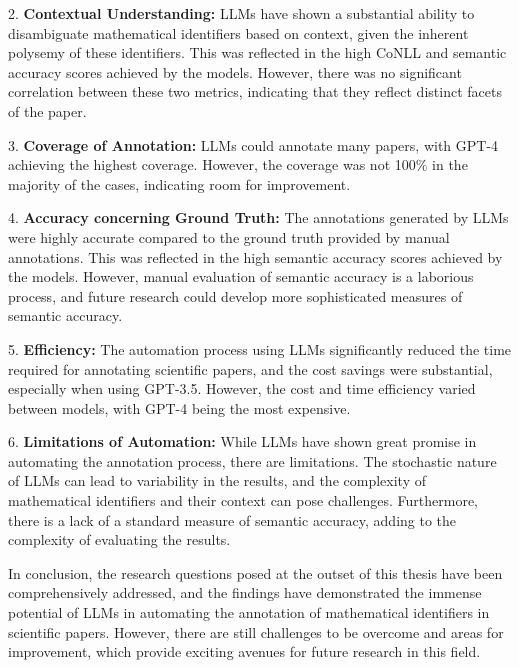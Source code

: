 2. \textbf{Contextual Understanding:} LLMs have shown a substantial ability to disambiguate mathematical identifiers based on context, given the inherent polysemy of these identifiers. This was reflected in the high CoNLL and semantic accuracy scores achieved by the models. However, there was no significant correlation between these two metrics, indicating that they reflect distinct facets of the paper.

3. \textbf{Coverage of Annotation:} LLMs could annotate many papers, with GPT-4 achieving the highest coverage. However, the coverage was not 100\% in the majority of the cases, indicating room for improvement.

4. \textbf{Accuracy concerning Ground Truth:} The annotations generated by LLMs were highly accurate compared to the ground truth provided by manual annotations. This was reflected in the high semantic accuracy scores achieved by the models. However, manual evaluation of semantic accuracy is a laborious process, and future research could develop more sophisticated measures of semantic accuracy.

5. \textbf{Efficiency:} The automation process using LLMs significantly reduced the time required for annotating scientific papers, and the cost savings were substantial, especially when using GPT-3.5. However, the cost and time efficiency varied between models, with GPT-4 being the most expensive.

6. \textbf{Limitations of Automation:} While LLMs have shown great promise in automating the annotation process, there are limitations. The stochastic nature of LLMs can lead to variability in the results, and the complexity of mathematical identifiers and their context can pose challenges. Furthermore, there is a lack of a standard measure of semantic accuracy, adding to the complexity of evaluating the results.

In conclusion, the research questions posed at the outset of this thesis have been comprehensively addressed, and the findings have demonstrated the immense potential of LLMs in automating the annotation of mathematical identifiers in scientific papers. However, there are still challenges to be overcome and areas for improvement, which provide exciting avenues for future research in this field.
